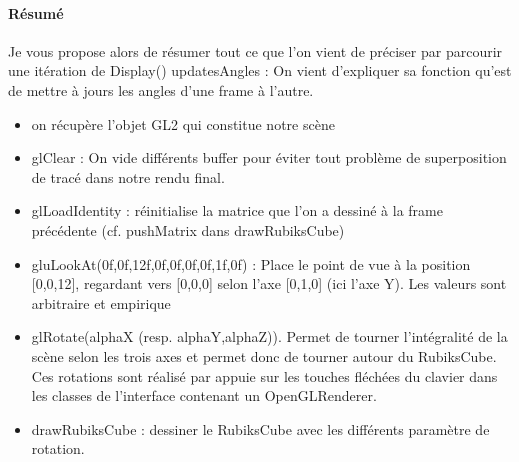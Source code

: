 \paragraph{Résumé}
Je vous propose alors de résumer tout ce que l’on vient de préciser par parcourir une itération de Display()
updatesAngles : On vient d’expliquer sa fonction qu’est de mettre à jours les angles d’une frame à l’autre.
\begin{itemize}
    \item on récupère l’objet GL2 qui constitue notre scène

    \item glClear : On vide différents buffer pour éviter tout problème de superposition de tracé dans notre rendu final.

    \item glLoadIdentity : réinitialise la matrice que l’on a dessiné à la frame précédente (cf. pushMatrix dans drawRubiksCube)

    \item gluLookAt(0f,0f,12f,0f,0f,0f,0f,1f,0f) : Place le point de vue à la position [0,0,12], regardant vers [0,0,0] selon l’axe [0,1,0] (ici l’axe Y). Les valeurs sont arbitraire et empirique

    \item glRotate(alphaX (resp. alphaY,alphaZ)). Permet de tourner l’intégralité de la scène selon les trois axes et permet donc de tourner autour du RubiksCube. Ces rotations sont réalisé par appuie sur les touches fléchées du clavier dans les classes de l’interface contenant un OpenGLRenderer.

    \item drawRubiksCube : dessiner le RubiksCube avec les différents paramètre de rotation.
\end{itemize}















